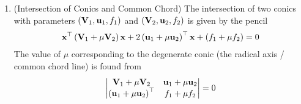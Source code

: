 \begin{enumerate}[label=\thesubsection.\arabic*, ref=\thesubsection.\theenumi,itemsep=0pt]
\begin{align}
\end{align}

where 
\begin{align}
\kappa_i = \frac{-\vec{m}^\top \brak{\vec{V}\vec{h} + \vec{u}} \pm \sqrt{\sbrak{\vec{m}^\top \brak{\vec{V}\vec{h} + \vec{u}}}^2 - g\brak{\vec{h}}\brak{\vec{m}^\top \vec{V} \vec{m}}}}{\vec{m}^\top \vec{V} \vec{m}}, i = 1,2.
\label{eq:EE26BTECH11213-conic_kappa_roots}
\end{align}
with $g\brak{\vec{h}} = \vec{h}^\top \vec{V} \vec{h} + 2\vec{u}^\top \vec{h} + f$.
%

\item (Intersection of Conics and Common Chord)
 The intersection of two conics with parameters $\left(\mathbf{V}_1, \mathbf{u}_1, f_1\right)$ and $\left(\mathbf{V}_2, \mathbf{u}_2, f_2\right)$ is given by the pencil
\begin{align}
\mathbf{x}^\top \left(\mathbf{V}_1 + \mu \mathbf{V}_2\right)\mathbf{x} + 2\left(\mathbf{u}_1 + \mu \mathbf{u}_2\right)^\top \mathbf{x} + \left(f_1 + \mu f_2\right) = 0 \label{eq:EE26BTECH11213-pencil_conics}
\end{align}
The value of $\mu$ corresponding to the degenerate conic (the radical axis / common chord line) is found from
\begin{align}
\begin{vmatrix}\mathbf{V}_1 + \mu \mathbf{V}_2 & \mathbf{u}_1 + \mu \mathbf{u}_2 \\ \left(\mathbf{u}_1 + \mu \mathbf{u}_2\right)^\top & f_1 + \mu f_2\end{vmatrix} = 0 \label{eq:EE26BTECH11213-pencil_det_zero}
\end{align}


\end{enumerate}
